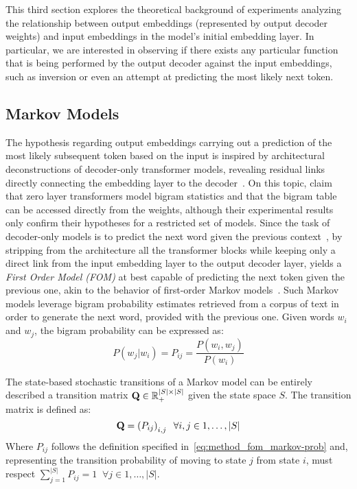 This third section explores the theoretical background of experiments analyzing the relationship between output embeddings (represented by output decoder weights) and input embeddings in the model's initial embedding layer.
In particular, we are interested in observing if there exists any particular function that is being performed by the output decoder against the input embeddings, such as inversion or even an attempt at predicting the most likely next token.

\subsection{Markov Models}

The hypothesis regarding output embeddings carrying out a prediction of the most likely subsequent token based on the input is inspired by architectural deconstructions of decoder-only transformer models, revealing residual links directly connecting the embedding layer to the decoder~\cite{vaswani2017}.
On this topic, \citet{elhage2021} claim that zero layer transformers model bigram statistics and that the bigram table can be accessed directly from the weights, although their experimental results only confirm their hypotheses for a restricted set of models.
Since the task of decoder-only models is to predict the next word given the previous context~\cite{radford2019}, by stripping from the architecture all the transformer blocks while keeping only a direct link from the input embedding layer to the output decoder layer, yields a \emph{First Order Model (FOM)} at best capable of predicting the next token given the previous one, akin to the behavior of first-order Markov models~\cite{markov2006}.
Such Markov models leverage bigram probability estimates retrieved from a corpus of text in order to generate the next word, provided with the previous one.
Given words $w_i$ and $w_j$, the bigram probability can be expressed as:
\begin{equation}
    \label{eq:method_fom_markov-prob}
    P(w_j|w_i) = P_{ij} = \frac{P(w_i, w_j)}{P(w_i)}
\end{equation}

The state-based stochastic transitions of a Markov model can be entirely described  a transition matrix $\bm{\mathbf{Q}} \in \mathbb {R}_{+}^{|S| \times |S|}$ given the state space $S$.
The transition matrix is defined as:
\begin{equation*}
    \bm{\mathbf{Q}} = \left(P_{ij}\right)_{i,j} \;\; \forall i,j \in 1,\dots,|S|
\end{equation*}
Where $P_{ij}$ follows the definition specified in~\cref{eq:method_fom_markov-prob} and, representing the transition probability of moving to state $j$ from state $i$, must respect $\sum_{j=1}^{|S|}{P_{ij}} = 1 \;\; \forall j \in 1,\dots,|S|$.


